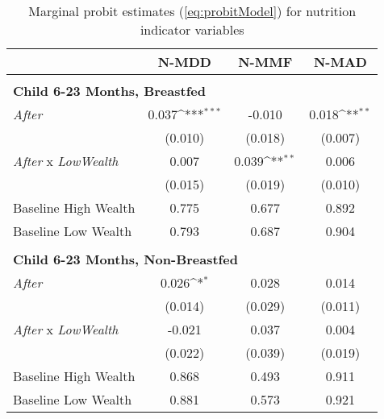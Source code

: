\begin{table}[htbp]\centering \footnotesize {}\caption{\label{tab:analysisNutritionDetailed} \footnotesize Marginal probit estimates (\cref{eq:probitModel}) for nutrition indicator variables}\begin{tabular}{l*{3}{c}} \hline\hline
                    &\multicolumn{1}{c}{N-MDD}&\multicolumn{1}{c}{N-MMF}&\multicolumn{1}{c}{N-MAD}\\
\hline \\ [-2em] \multicolumn{4}{l}{\textbf{Child 6-23 Months, Breastfed}} \\
\textit{After}      &       0.037\sym{***}&      -0.010         &       0.018\sym{**} \\
                    &     (0.010)         &     (0.018)         &     (0.007)         \\
[1em]
\textit{After} x \textit{LowWealth}&       0.007         &       0.039\sym{**} &       0.006         \\
                    &     (0.015)         &     (0.019)         &     (0.010)         \\
\hline
Baseline High Wealth&       0.775         &       0.677         &       0.892         \\
Baseline Low Wealth &       0.793         &       0.687         &       0.904         \\
\\ [-2em] \hline \multicolumn{4}{l}{\textbf{Child 6-23 Months, Non-Breastfed}} \\
\textit{After}      &       0.026\sym{*}  &       0.028         &       0.014         \\
                    &     (0.014)         &     (0.029)         &     (0.011)         \\
[1em]
\textit{After} x \textit{LowWealth}&      -0.021         &       0.037         &       0.004         \\
                    &     (0.022)         &     (0.039)         &     (0.019)         \\
\hline
Baseline High Wealth&       0.868         &       0.493         &       0.911         \\
Baseline Low Wealth &       0.881         &       0.573         &       0.921         \\

\end{tabular}
\end{table}
